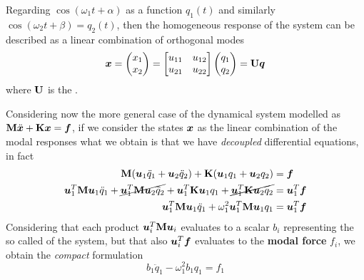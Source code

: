 	Regarding $\cos(\omega_1 t + \alpha)$ as a function $q_1(t)$ and similarly $\cos(\omega_2 t + \beta) = q_2(t)$, then the homogeneous response of the system can be described as a linear combination of orthogonal modes
	\begin{equation}
		\boldsymbol{x} = \begin{pmatrix} x_1 \\ x_2 \end{pmatrix} = \begin{bmatrix} u_{11} & u_{12} \\ u_{21} & u_{22}  \end{bmatrix} \begin{pmatrix} q_1 \\ q_2 \end{pmatrix} = \mathbf{U} \boldsymbol{q}
	\end{equation}
	where $\mathbf{U}$ is the .
	
	Considering now the more general case of the dynamical system modelled as $\mathbf{M} \ddot{\boldsymbol{x}} + \mathbf{K} \boldsymbol{x} = \boldsymbol{f}$, if we consider the states $\boldsymbol{x}$ as the linear combination of the modal responses what we obtain is that we have \textit{decoupled} differential equations, in fact
	\begin{align*}
		\mathbf{M} (\boldsymbol{u}_1 \ddot q_1 + \boldsymbol{u}_2 \ddot q_2) + \mathbf{K}(\boldsymbol{u}_1  q_1 + \boldsymbol{u}_2  q_2)  & = \boldsymbol{f} \\
		\boldsymbol{u}_1^T \mathbf{M} \boldsymbol{u}_1 \ddot q_1 + \cancel{\boldsymbol{u}_1^T \mathbf{M} \boldsymbol{u}_2 \ddot q_2} + \boldsymbol{u}_1^T \mathbf{K} \boldsymbol{u}_1  q_1 + \cancel{ \boldsymbol{u}_1^T \mathbf{K} \boldsymbol{u}_2  q_2}  & = \boldsymbol{u}_1^T\boldsymbol{f} \\
		\boldsymbol{u}_1^T \mathbf{M} \boldsymbol{u}_1 \ddot q_1 + \omega_1^2 \boldsymbol{u}_1^T \mathbf{M} \boldsymbol{u}_1  q_1  & = \boldsymbol{u}_1^T\boldsymbol{f}
	\end{align*}
	Considering that each product $\boldsymbol{u}_i^T \mathbf{M} \boldsymbol{u}_i$ evaluates to a scalar $b_i$ representing the so called  of the system, but that also $\boldsymbol{u}_i^T \boldsymbol{f}$ evaluates to the \textbf{modal force} $f_i$, we obtain the \textit{compact} formulation
	\[ b_1 \ddot q_1 - \omega_1^2 b_1 q_1 = f_1 \]
		
		
		
		
		
		
		
		